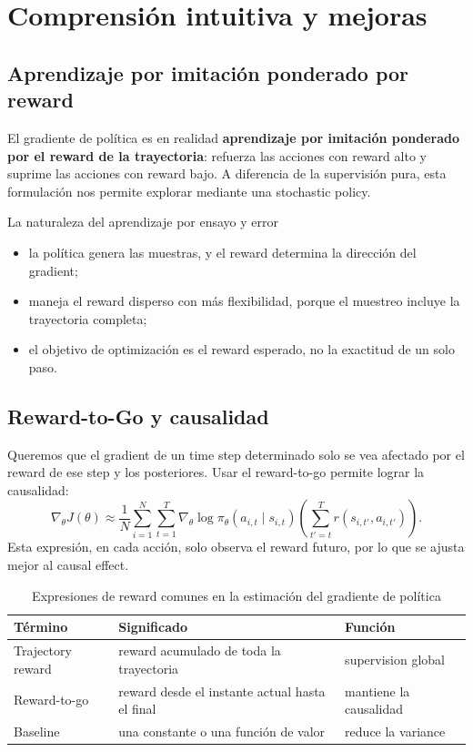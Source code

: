 \section{Comprensión intuitiva y mejoras}

\subsection{Aprendizaje por imitación ponderado por reward}

El gradiente de política es en realidad \textbf{aprendizaje por imitación ponderado por el reward de la trayectoria}: refuerza las acciones con reward alto y suprime las acciones con reward bajo. A diferencia de la supervisión pura, esta formulación nos permite explorar mediante una stochastic policy.

\begin{knowledgebox}{La naturaleza del aprendizaje por ensayo y error}
\begin{itemize}
    \item la política genera las muestras, y el reward determina la dirección del gradient;
    \item maneja el reward disperso con más flexibilidad, porque el muestreo incluye la trayectoria completa;
    \item el objetivo de optimización es el reward esperado, no la exactitud de un solo paso.
\end{itemize}
\end{knowledgebox}

\subsection{Reward-to-Go y causalidad}

Queremos que el gradient de un time step determinado solo se vea afectado por el reward de ese step y los posteriores. Usar el reward-to-go permite lograr la causalidad:
$$\nabla_\theta J(\theta) \approx \frac{1}{N}\sum_{i=1}^{N}\sum_{t=1}^{T} \nabla_\theta \log \pi_\theta(a_{i,t} \mid s_{i,t}) \left(\sum_{t'=t}^{T} r(s_{i,t'}, a_{i,t'}) \right).$$
Esta expresión, en cada acción, solo observa el reward futuro, por lo que se ajusta mejor al causal effect.

\begin{table}[H]
\centering
\small
\begin{tabular}{p{}p{}p{}}
\toprule
Término & Significado & Función \\
\midrule
Trajectory reward & reward acumulado de toda la trayectoria & supervision global \\
Reward-to-go & reward desde el instante actual hasta el final & mantiene la causalidad \\
Baseline & una constante o una función de valor & reduce la variance \\
\bottomrule
\end{tabular}
\caption{Expresiones de reward comunes en la estimación del gradiente de política}
\end{table}

